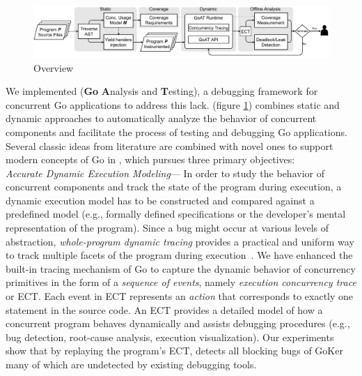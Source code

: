 \begin{figure}[]
\centering
\includegraphics[width=0.9\linewidth]{figs/GOAT_overview.pdf}
\caption{\goat Overview}
\label{fig:goat_workflow}
\end{figure}


We implemented \goat (\textbf{Go} \textbf{A}nalysis and \textbf{T}esting), a debugging framework for concurrent Go applications to address this lack.
%
\goat (figure \ref{fig:goat_workflow}) combines static and dynamic approaches to automatically analyze the behavior of concurrent components and facilitate the process of testing and debugging Go applications.
%
%
Several classic ideas from literature are combined with novel ones to support modern concepts of Go in \goat, which pursues three primary objectives:
\\
 \textit{Accurate Dynamic Execution Modeling}---
In order to study the behavior of concurrent components and track the state of the program during execution, a dynamic execution model has to be constructed and compared against a predefined model (e.g., formally defined specifications or the developer's mental representation of the program).
%
%
Since a bug might occur at various levels of abstraction, \textit{whole-program dynamic tracing} provides a practical and uniform way to track multiple facets of the program during execution~\cite{difftrace}.
%
We have enhanced the built-in tracing mechanism of Go to capture the dynamic behavior of concurrency primitives in the form of a \textit{sequence of events}, namely \textit{execution concurrency trace} or ECT.
%
Each event in ECT represents an \textit{action} that corresponds to exactly one statement in the source code.
%
An ECT provides a detailed model of how a concurrent program behaves dynamically and assists debugging procedures (e.g., bug detection, root-cause analysis, execution visualization).
%
Our experiments show that by replaying the program's ECT, \goat detects all blocking bugs of GoKer~\cite{yuan-gobench-cgo21} many of which are undetected by existing debugging tools.
